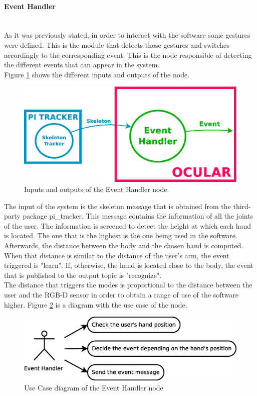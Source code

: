 \paragraph{Event Handler}\mbox{}\\

	As it was previously stated, in order to interact with the software some gestures were defined. This is the module that detects those gestures and switches accordingly to the corresponding event. This is the node responsible of detecting the different events that can appear in the system. 
	\\
	Figure \ref{node_event} shows the different inputs and outputs of the node. 
		\begin{figure}[H]
			\begin{center}
			\includegraphics[width=0.5\linewidth]{img/diagrams/node_event.eps}
			\caption[Event Handler 3D node I/O]{Inputs and outputs of the Event Handler node.}		
			\label{node_event}
			\end{center}
		\end{figure}
	The input of the system is the skeleton message that is obtained from the third-party package pi\_tracker. This message contains the information of all the joints of the user. The information is screened to detect the height at which each hand is located. The one that is the highest is the one being used in the software. Afterwards, the distance between the body and the chosen hand is computed. When that distance is similar to the distance of the user's arm, the event triggered is "learn". If, otherwise, the hand is located close to the body, the event that is published to the output topic is "recognize". 
	\\

	The distance that triggers the modes is proportional to the distance between the user and the RGB-D sensor in order to obtain a range of use of the software higher. 
	Figure \ref{uc_event} is a diagram with the use case of the node. 
	\begin{figure}[H]
		\centering
			\includegraphics[scale=0.4]{img/diagrams/uc_event_handler.eps}
			\caption[Use case diagram Event Handler node]{Use Case diagram of the Event Handler node}
		\label{uc_event}
	\end{figure}

